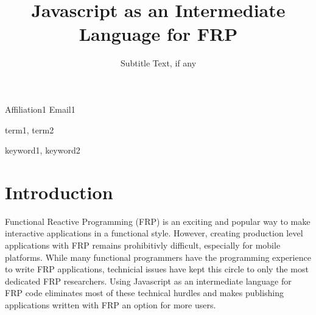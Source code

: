 \documentclass{sigplanconf}
\begin{document}
\setlength{\pdfpageheight}{\paperheight}
\setlength{\pdfpagewidth}{\paperwidth}






\title{Javascript as an Intermediate Language for FRP}
\subtitle{Subtitle Text, if any}

           {Affiliation1}
           {Email1}

\maketitle



\terms
term1, term2

\keywords
keyword1, keyword2

\section{Introduction}


Functional Reactive Programming (FRP) is an exciting and popular way to make interactive applications in a functional style.
However, creating production level applications with FRP remains prohibitivly difficult, especially for mobile platforms.
While many functional programmers have the programming experience to write FRP applications, technicial issues have kept this circle to only the most dedicated FRP researchers.
Using Javascript as an intermediate language for FRP code eliminates most of these technical hurdles and makes publishing applications written with FRP an option for more users.
\end{document}
